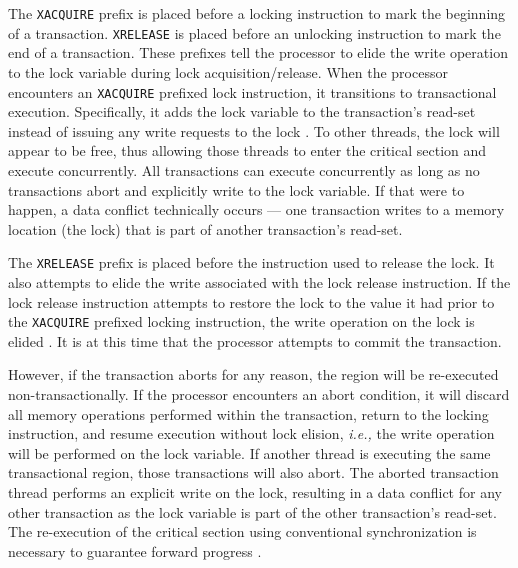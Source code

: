 \documentclass{sig-alternate}
\begin{document}
The \texttt{XACQUIRE} prefix is placed before a locking instruction to mark the beginning
of a transaction.  \texttt{XRELEASE} is placed before an unlocking instruction to mark the
end of a transaction.  These prefixes tell the processor to elide the write operation to
the lock variable during lock acquisition/release.  When the processor encounters an
\texttt{XACQUIRE} prefixed lock instruction, it transitions to transactional execution.
Specifically, it adds the lock variable to the transaction's read-set instead of issuing
any write requests to the lock \cite{intel_prog_ref}.  To other threads, the lock will
appear to be free, thus allowing those threads to enter the critical section and execute
concurrently.  All transactions can execute concurrently as long as no transactions abort
and explicitly write to the lock variable.  If that were to happen, a data conflict
technically occurs --- one transaction writes to a memory location (the lock) that is part
of another transaction's read-set.

The \texttt{XRELEASE} prefix is placed before the instruction used to release the lock.
It also attempts to elide the write associated with the lock release instruction.  If the
lock release instruction attempts to restore the lock to the value it had prior to the
\texttt{XACQUIRE} prefixed locking instruction, the write operation on the lock is elided
\cite{intel_prog_ref}.  It is at this time that the processor attempts to commit the
transaction.  

However, if the transaction aborts for any reason, the region will be re-executed
non-transactionally.  If the processor encounters an abort condition, it will discard all
memory operations performed within the transaction, return to the locking instruction, and
resume execution without lock elision, \emph{i.e.,} the write operation will be performed
on the lock variable.  If another thread is executing the same transactional region, those
transactions will also abort.  The aborted transaction thread performs an explicit write
on the lock, resulting in a data conflict for any other transaction as the lock variable
is part of the other transaction's read-set.  The re-execution of the critical section
using conventional synchronization is necessary to guarantee forward progress
\cite{intel_prog_ref}.
\end{document}
